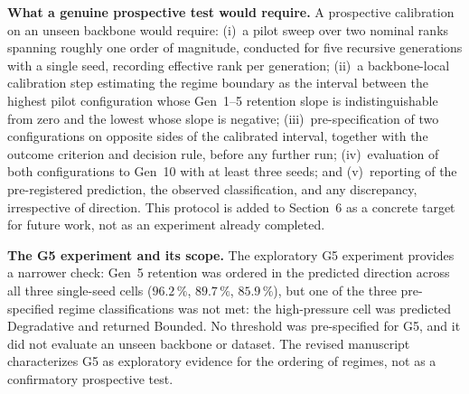 \documentclass[11pt,a4paper]{article}
\begin{document}
\textbf{What a genuine prospective test would require.}
A prospective calibration on an unseen backbone would require: (i)~a
pilot sweep over two nominal ranks spanning roughly one order of magnitude,
conducted for five recursive generations with a single seed, recording
effective rank per generation; (ii)~a backbone-local calibration step
estimating the regime boundary as the interval between the highest pilot
configuration whose Gen~1--5 retention slope is indistinguishable from
zero and the lowest whose slope is negative; (iii)~pre-specification of
two configurations on opposite sides of the calibrated interval, together
with the outcome criterion and decision rule, before any further run;
(iv)~evaluation of both configurations to Gen~10 with at least three
seeds; and (v)~reporting of the pre-registered prediction, the observed
classification, and any discrepancy, irrespective of direction. This
protocol is added to Section~6 as a concrete target for future work,
not as an experiment already completed.

\textbf{The G5 experiment and its scope.}
The exploratory G5 experiment provides a narrower check: Gen~5 retention
was ordered in the predicted direction across all three single-seed cells
($96.2\,\%$, $89.7\,\%$, $85.9\,\%$), but one of the three pre-specified
regime classifications was not met: the high-pressure cell was predicted
Degradative and returned Bounded. No threshold was pre-specified for G5,
and it did not evaluate an unseen backbone or dataset. The revised
manuscript characterizes G5 as exploratory evidence for the ordering
of regimes, not as a confirmatory prospective test.
\end{document}
